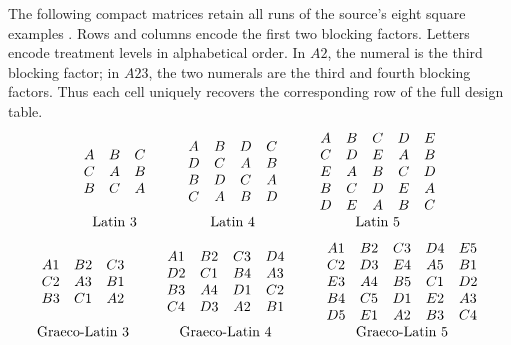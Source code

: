 The following compact matrices retain all runs of the source's eight square
examples \cite[\S\S5.3.3.2.1--5.3.3.2.3]{NISTSEMATECH2012DOE}.
Rows and columns encode the first two blocking factors. Letters encode
treatment levels in alphabetical order. In \(A2\), the numeral is the
third blocking factor; in \(A23\), the two numerals are the third and
fourth blocking factors. Thus each cell uniquely recovers the corresponding
row of the full design table.
\[
\begin{array}{c@{\qquad}c@{\qquad}c}
\begin{array}{ccc}A&B&C\\C&A&B\\B&C&A\end{array}&
\begin{array}{cccc}A&B&D&C\\D&C&A&B\\B&D&C&A\\C&A&B&D\end{array}&
\begin{array}{ccccc}A&B&C&D&E\\C&D&E&A&B\\E&A&B&C&D\\B&C&D&E&A\\D&E&A&B&C\end{array}\\[4pt]
\text{Latin }3&\text{Latin }4&\text{Latin }5
\end{array}
\]
\[
\begin{array}{c@{\qquad}c@{\qquad}c}
\begin{array}{ccc}A1&B2&C3\\C2&A3&B1\\B3&C1&A2\end{array}&
\begin{array}{cccc}A1&B2&C3&D4\\D2&C1&B4&A3\\B3&A4&D1&C2\\C4&D3&A2&B1\end{array}&
\begin{array}{ccccc}A1&B2&C3&D4&E5\\C2&D3&E4&A5&B1\\E3&A4&B5&C1&D2\\B4&C5&D1&E2&A3\\D5&E1&A2&B3&C4\end{array}\\[4pt]
\text{Graeco-Latin }3&\text{Graeco-Latin }4&\text{Graeco-Latin }5
\end{array}
\]
